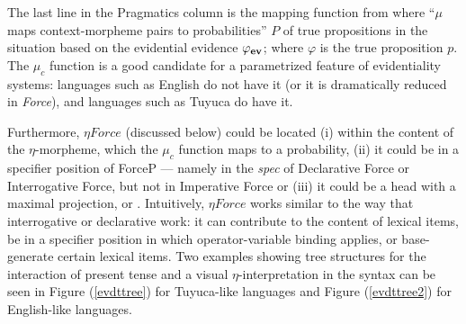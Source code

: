 \documentclass{article}
\begin{document}
The last line in the {\sc Pragmatics} column is the mapping function from  where ``$\mu$ maps context-morpheme pairs to probabilities'' $P$ of true propositions in the situation based on the evidential evidence $\varphi_{{\bf ev}}$; where $\varphi$ is the true proposition $p$. The $\mu_{c}$ function is a good candidate for a parametrized feature of evidentiality systems: languages such as English do not have it (or it is dramatically reduced in {\sl Force}), and languages such as Tuyuca do have it. 

Furthermore, $\eta Force$ (discussed below) could be located (i) within the content of the $\eta$-morpheme, which the $\mu_{c}$ function maps to a probability, (ii) it could be in a specifier position of ForceP --- namely in the {\sl spec} of Declarative Force or Interrogative Force, but not in Imperative Force or (iii) it could be a head with a maximal projection, \mbar{$\eta$} or \iibar{$\eta$}. Intuitively, $\eta Force$ works similar to the way that interrogative or declarative work: it can contribute to the content of lexical items, be in a specifier position in which operator-variable binding applies, or base-generate certain lexical items. Two examples showing tree structures for the interaction of present tense and a visual $\eta$-interpretation in the syntax can be seen in Figure (\ref{evdttree}) for Tuyuca-like languages and Figure (\ref{evdttree2}) for English-like languages.

% 
\end{document}
